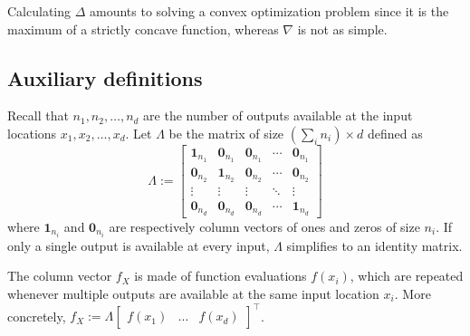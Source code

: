 Calculating $\Delta$ amounts to solving a convex optimization problem since it is the maximum of a strictly concave function, whereas $\nabla$ is not as simple.


\subsection{Auxiliary definitions}
\label{sec.auxiliary_definitions}

Recall that $n_1, n_2, \dots, n_d$ are the number of outputs available at the input locations $x_1,x_2,\dots,x_d$. Let $\Lambda$ be the matrix of size $(\sum_i n_i) \times d$ defined as
\begin{equation}
	\Lambda :=
	\begin{bmatrix}
		\bm{1}_{n_1} & \bm{0}_{n_1} & \bm{0}_{n_1} & \cdots & \bm{0}_{n_1} \\
		\bm{0}_{n_2} & \bm{1}_{n_2} & \bm{0}_{n_2} & \cdots & \bm{0}_{n_2} \\
		\vdots & \vdots & \vdots & \ddots & \vdots \\ 
		\bm{0}_{n_d} & \bm{0}_{n_d} & \bm{0}_{n_d} & \cdots & \bm{1}_{n_d} 
	\end{bmatrix}
\end{equation}
where $\bm{1}_{n_i}$ and $\bm{0}_{n_i}$ are respectively column vectors of ones and zeros of size $n_i$. If only a single output is available at every input, $\Lambda$ simplifies to an identity matrix.

The column vector $f_X$ is made of function evaluations $f(x_i)$, which are repeated whenever multiple outputs are available at the same input location $x_i$. More concretely, $f_X := \Lambda \begin{bmatrix} f(x_1) & \dots & f(x_d) \end{bmatrix}^\top$.

